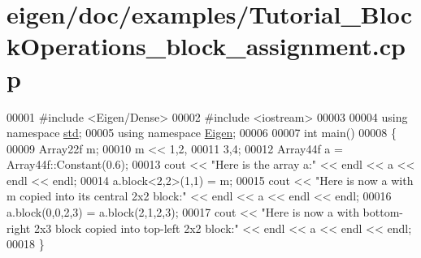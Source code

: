 \hypertarget{eigen_2doc_2examples_2_tutorial___block_operations__block__assignment_8cpp_source}{}\section{eigen/doc/examples/\+Tutorial\+\_\+\+Block\+Operations\+\_\+block\+\_\+assignment.cpp}
\label{eigen_2doc_2examples_2_tutorial___block_operations__block__assignment_8cpp_source}

\begin{DoxyCode}
00001 \textcolor{preprocessor}{#include <Eigen/Dense>}
00002 \textcolor{preprocessor}{#include <iostream>}
00003 
00004 \textcolor{keyword}{using namespace }\hyperlink{namespacestd}{std};
00005 \textcolor{keyword}{using namespace }\hyperlink{namespace_eigen}{Eigen};
00006 
00007 \textcolor{keywordtype}{int} main()
00008 \{
00009   Array22f m;
00010   m << 1,2,
00011        3,4;
00012   Array44f a = Array44f::Constant(0.6);
00013   cout << \textcolor{stringliteral}{"Here is the array a:"} << endl << a << endl << endl;
00014   a.block<2,2>(1,1) = m;
00015   cout << \textcolor{stringliteral}{"Here is now a with m copied into its central 2x2 block:"} << endl << a << endl << endl;
00016   a.block(0,0,2,3) = a.block(2,1,2,3);
00017   cout << \textcolor{stringliteral}{"Here is now a with bottom-right 2x3 block copied into top-left 2x2 block:"} << endl << a << endl 
      << endl;
00018 \}
\end{DoxyCode}
